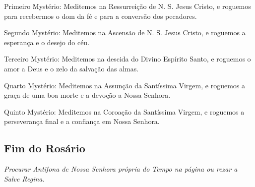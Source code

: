 {\redx Primeiro Mystério:} Meditemos na Ressurreição de N. S. Jesus Cristo, e roguemos para recebermos o dom da fé e para a conversão dos pecadores.\par
{\redx Segundo Mystério:} Meditemos na Ascensão de N. S. Jesus Cristo, e roguemos a esperança e o desejo do céu.\par
{\redx Terceiro Mystério:} Meditemos na descida do Divino Espírito Santo, e roguemos o amor a Deus e o zelo da salvação das almas.\par
{\redx Quarto Mystério:} Meditemos na Assunção da Santíssima Virgem, e roguemos a graça de uma boa morte e a devoção a Nossa Senhora.\par
{\redx Quinto Mystério:} Meditemos na Coroação da Santíssima Virgem, e roguemos a perseverança final e a confiança em Nossa Senhora.

\subsection{Fim do Rosário}

\emph{Procurar Antifona de Nossa Senhora própria do Tempo na página \pageref{antifonasnossasenhora} ou rezar a Salve Regina.}


